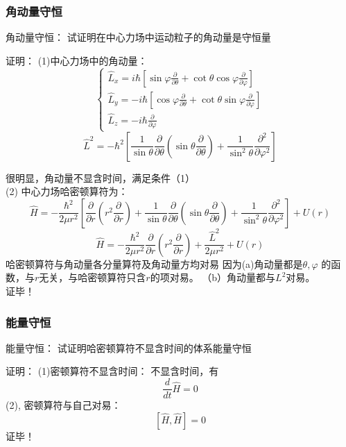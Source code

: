 \begin{frame} [allowframebreaks=]
    \frametitle{角动量守恒} 
    \begin{tcolorbox1}{角动量守恒：}
        试证明在中心力场中运动粒子的角动量是守恒量                                
    \end{tcolorbox1}
    \alert{证明：} (1)中心力场中的角动量：
    $$
    \left\{\begin{array}{l}
        \hat{L}_{x}=i \hbar\left[\sin \varphi \frac{\partial}{\partial \theta}+\cot \theta \cos \varphi \frac{\partial}{\partial \varphi}\right] \\
        \hat{L}_{y}=-i \hbar\left[\cos \varphi \frac{\partial}{\partial \theta}+\cot \theta \sin \varphi \frac{\partial}{\partial \varphi}\right] \\
        \hat{L}_{z}=-i \hbar \frac{\partial}{\partial \varphi}
        \end{array}\right.
    $$
    $$ \hat{L}^{2}=-\hbar^{2}\left[\frac{1}{\sin \theta} \frac{\partial}{\partial \theta}\left(\sin \theta \frac{\partial}{\partial \theta}\right)+\frac{1}{\sin ^{2} \theta} \frac{\partial^{2}}{\partial \varphi^{2}}\right] $$
    
    很明显，角动量不显含时间，满足条件（1）\\
    (2) 中心力场哈密顿算符为： 
    $$
    \hat{H}=-\frac{\hbar^{2}}{2 \mu r^{2}}\left[\frac{\partial}{\partial r}\left(r^{2} \frac{\partial}{\partial r}\right)+\frac{1}{\sin \theta} \frac{\partial}{\partial \theta}\left(\sin \theta \frac{\partial}{\partial \theta}\right)+\frac{1}{\sin ^{2} \theta} \frac{\partial^{2}}{\partial \varphi^{2}}\right]+U(r)
    $$
    $$
    \hat{H}=-\frac{\hbar^{2}}{2 \mu r^{2}} \frac{\partial}{\partial r}\left(r^{2} \frac{\partial}{\partial r}\right)+\frac{\hat{L}^{2}}{2 \mu r^{2}}+U(r)
    $$
    哈密顿算符与角动量各分量算符及角动量方均对易 因为(a)角动量都是$\theta, \varphi$ 的函数，与$r$无关，与哈密顿算符只含$r$的项对易。
    （b）角动量都与$L^2$对易。\\
    证毕！
\end{frame}

\begin{frame} [allowframebreaks=]
    \frametitle{能量守恒} 
    \begin{tcolorbox1}{能量守恒：}
        试证明哈密顿算符不显含时间的体系能量守恒                               
    \end{tcolorbox1}
    \alert{证明：} (1)密顿算符不显含时间：
    不显含时间，有 $$\frac{d}{dt}\hat{H}=0$$ 
    (2), 密顿算符与自己对易： 
        $$ [\hat{H},\hat{H}]=0 $$
    证毕！
\end{frame}

